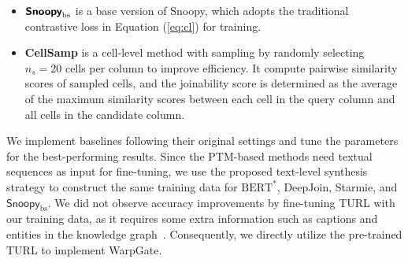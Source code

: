 \begin{itemize}
\item{} $\textbf{\textsf{Snoopy}}_\text{bs}$ is a base version of \textsf{Snoopy}, which adopts the traditional contrastive loss in Equation (\ref{eq:cl}) for training.
\item{} \textbf{CellSamp} is a cell-level method with sampling  by randomly selecting $n_s = 20$ cells per column to improve efficiency. It compute pairwise similarity scores of sampled cells, and the joinability score is determined as the average of the maximum similarity scores between each cell in the query column and all cells in the candidate column.
 
\end{itemize}

We implement baselines following their original settings and tune the parameters for the best-performing results. Since the PTM-based methods need textual sequences as input for fine-tuning, we use the proposed text-level synthesis strategy to construct the same training data for $\text{BERT}^*$, DeepJoin, Starmie, and $\textsf{Snoopy}_\text{bs}$. 
We did not observe accuracy improvements by fine-tuning TURL with our training data, as it requires some extra information such as captions and entities in the knowledge graph~\cite{turl}. Consequently, we directly utilize the pre-trained TURL to implement WarpGate.










